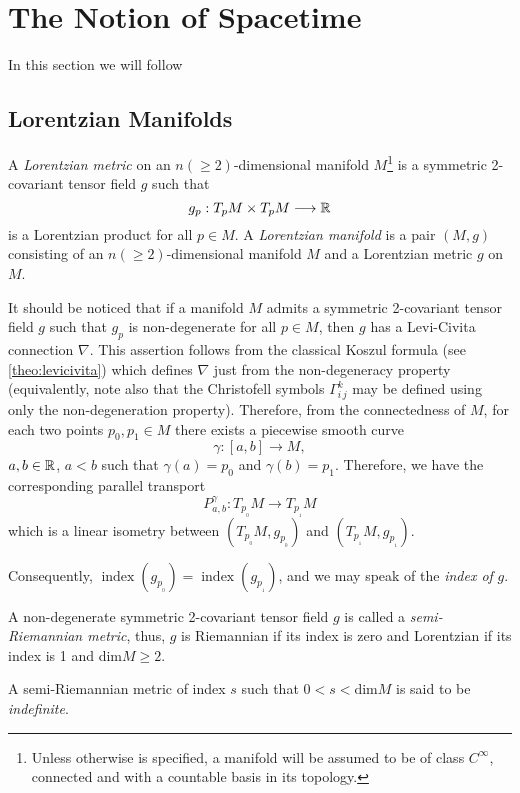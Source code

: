 \chapter{The Notion of Spacetime}

In this section we will follow \cite{romero10}

\section{Lorentzian Manifolds}

A \emph{Lorentzian metric} on an $n(\geq 2)$-dimensional manifold $M$\footnote{Unless otherwise is specified, a manifold will be assumed to be of class $C^{\infty}$, connected and with a countable basis in its topology.} is a symmetric 2-covariant tensor field $g$ such that $$g_p : T_pM\times T_pM \longrightarrow \mathbb{R}$$ is a Lorentzian product for all $p\in M$. A \emph{Lorentzian manifold} is a pair $(M,g)$ consisting of an $n(\geq 2)$-dimensional manifold $M$ and a Lorentzian metric $g$ on $M$.


It should be noticed that if a manifold $M$ admits a symmetric 2-covariant tensor field $g$ such that $g_p$ is non-degenerate for all $p\in M$, then $g$ has a Levi-Civita connection $\nabla$. This assertion follows from the classical Koszul formula (see \autoref{theo:levicivita}) which defines $\nabla$ just from the non-degeneracy property (equivalently, note also that the Christofell symbols $\Gamma_{i\,j}^k$ may be defined using only the non-degeneration property). Therefore, from the connectedness of $M$, for each two points $p_0,p_1\in M$ there exists a piecewise smooth curve
\[
	\gamma : [a,b] \longrightarrow M,
\]
$a,b\in \mathbb{R}$, $a<b$ such that $\gamma(a)=p_0$ and $\gamma(b)=p_1$. Therefore, we have the corresponding parallel transport
\[
P_{a,b}^{\gamma} : T_{p_{_0}}M \longrightarrow T_{p_{_1}}M
\]
which is a linear isometry between $(T_{p_{_0}}M,g_{p_{_0}})$ and  $(T_{p_{_1}}M,g_{p_{_1}})$.

Consequently, $\operatorname{index}(g_{p_{_0}}) = \operatorname{index}(g_{p_{_1}})$, and we may speak of the \emph{index of} $g$.

A non-degenerate symmetric 2-covariant tensor field $g$ is called a \emph{semi-Riemannian metric}, thus, $g$ is Riemannian if its index is zero and Lorentzian if its index is 1 and dim$M\geq 2$.

A semi-Riemannian metric of index $s$ such that $0<s<\mathrm{dim}M$ is said to be \emph{indefinite}.

